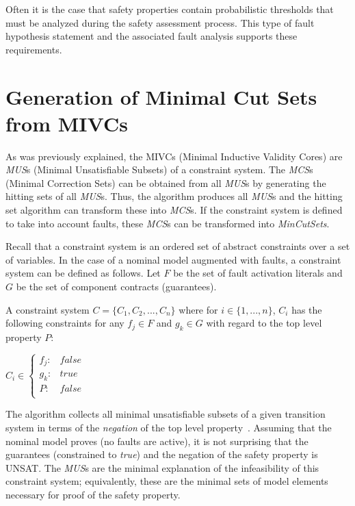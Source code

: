Often it is the case that safety properties contain probabilistic thresholds that must be analyzed during the safety assessment process. This type of fault hypothesis statement and the associated fault analysis supports these requirements.

\section{Generation of Minimal Cut Sets from MIVCs}
As was previously explained, the MIVCs (Minimal Inductive Validity Cores) are \textit{MUS}s (Minimal Unsatisfiable Subsets) of a constraint system. The \textit{MCS}s (Minimal Correction Sets) can be obtained from all \textit{MUS}s by generating the hitting sets of all \textit{MUS}s. Thus, the \aivcalg algorithm produces all \textit{MUS}s and the hitting set algorithm can transform these into \textit{MCS}s. If the constraint system is defined to take into account faults, these \textit{MCS}s can be transformed into \textit{MinCutSets}. 

Recall that a constraint system is an ordered set of abstract constraints over a set of variables. In the case of a nominal model augmented with faults, a constraint system can be defined as follows. Let $F$ be the set of fault activation literals and $G$ be the set of component contracts (guarantees). 

\begin{definition}A constraint system $C = \{C_1,C_2,...,C_n\}$ where for $i \in \{1,...,n\}$, $C_i$ has the following constraints for any $f_j \in F$ and $g_k \in G$ with regard to the top level property $P$: 
\begin{center}
$C_i \in \left\{ \begin{array}{ll}
	f_j :&  false\\
	g_k :& true\\
	P :& false\\
\end{array}\right.$	
\end{center}
\label{def:constraintsystem}
\end{definition}

The \aivcalg algorithm collects all minimal unsatisfiable subsets of a given transition system in terms of the \textit{negation} of the top level property~\cite{Ghassabani2017EfficientGO,bendik2018online}. Assuming that the nominal model proves (no faults are active), it is not surprising that the guarantees (constrained to \textit{true}) and the negation of the safety property is UNSAT. The \textit{MUS}s are the minimal explanation of the infeasibility of this constraint system; equivalently, these are the minimal sets of model elements necessary for proof of the safety property.

